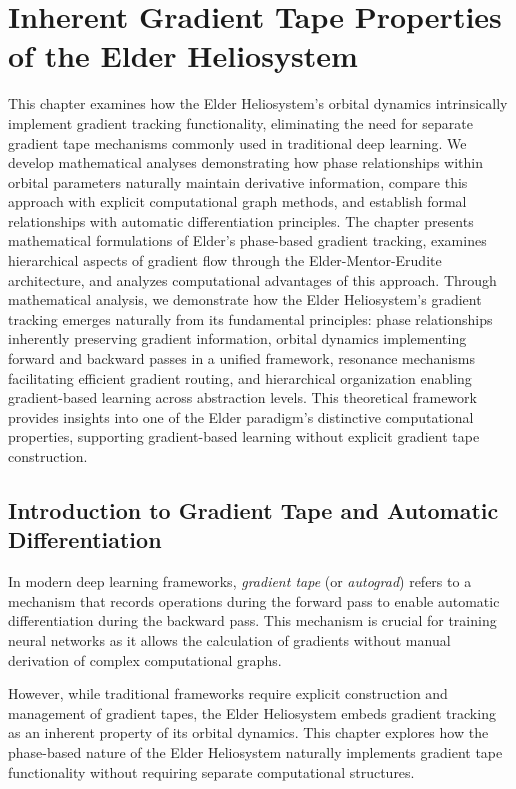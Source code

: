 \chapter{Inherent Gradient Tape Properties of the Elder Heliosystem}

\begin{tcolorbox}[colback=blue!5!white,colframe=blue!75!black,title=Chapter Summary]
This chapter examines how the Elder Heliosystem's orbital dynamics intrinsically implement gradient tracking functionality, eliminating the need for separate gradient tape mechanisms commonly used in traditional deep learning. We develop mathematical analyses demonstrating how phase relationships within orbital parameters naturally maintain derivative information, compare this approach with explicit computational graph methods, and establish formal relationships with automatic differentiation principles. The chapter presents mathematical formulations of Elder's phase-based gradient tracking, examines hierarchical aspects of gradient flow through the Elder-Mentor-Erudite architecture, and analyzes computational advantages of this approach. Through mathematical analysis, we demonstrate how the Elder Heliosystem's gradient tracking emerges naturally from its fundamental principles: phase relationships inherently preserving gradient information, orbital dynamics implementing forward and backward passes in a unified framework, resonance mechanisms facilitating efficient gradient routing, and hierarchical organization enabling gradient-based learning across abstraction levels. This theoretical framework provides insights into one of the Elder paradigm's distinctive computational properties, supporting gradient-based learning without explicit gradient tape construction.
\end{tcolorbox}

\section{Introduction to Gradient Tape and Automatic Differentiation}

In modern deep learning frameworks, \textit{gradient tape} (or \textit{autograd}) refers to a mechanism that records operations during the forward pass to enable automatic differentiation during the backward pass. This mechanism is crucial for training neural networks as it allows the calculation of gradients without manual derivation of complex computational graphs.

However, while traditional frameworks require explicit construction and management of gradient tapes, the Elder Heliosystem embeds gradient tracking as an inherent property of its orbital dynamics. This chapter explores how the phase-based nature of the Elder Heliosystem naturally implements gradient tape functionality without requiring separate computational structures.

